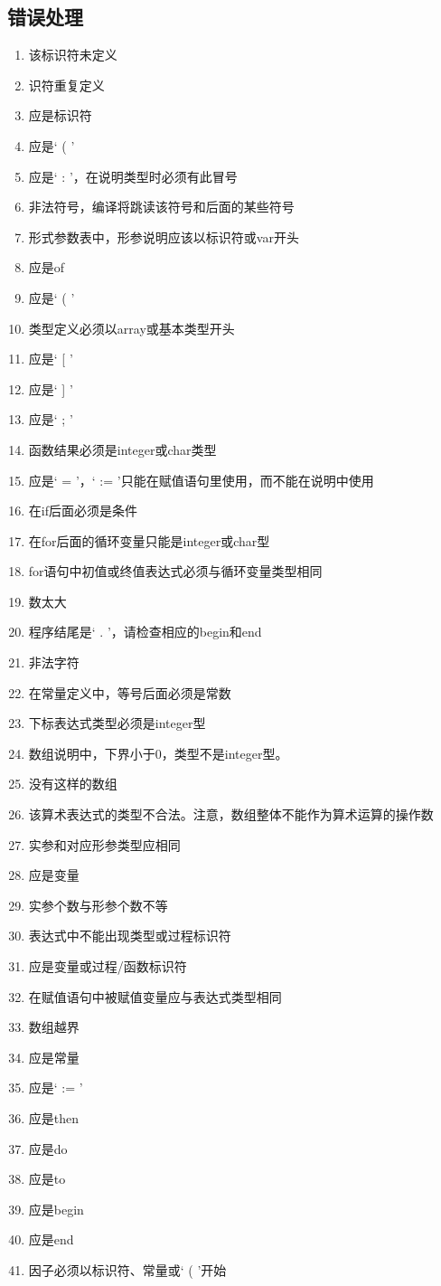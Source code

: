 \subsection{错误处理}
\begin{enumerate}
  \item 该标识符未定义
  \item 识符重复定义
  \item 应是标识符
  \item 应是‘ ( ’
  \item 应是‘ : ’，在说明类型时必须有此冒号
  \item 非法符号，编译将跳读该符号和后面的某些符号
  \item 形式参数表中，形参说明应该以标识符或var开头
  \item 应是of
  \item 应是‘ ( ’
  \item 类型定义必须以array或基本类型开头
  \item 应是‘ [ ’
  \item 应是‘ ] ’
  \item 应是‘ ; ’
  \item 函数结果必须是integer或char类型
  \item 应是‘ = ’，‘ := ’只能在赋值语句里使用，而不能在说明中使用
  \item 在if后面必须是条件
  \item 在for后面的循环变量只能是integer或char型
  \item for语句中初值或终值表达式必须与循环变量类型相同
  \item 数太大
  \item 程序结尾是‘ . ’，请检查相应的begin和end
  \item 非法字符
  \item 在常量定义中，等号后面必须是常数
  \item 下标表达式类型必须是integer型
  \item 数组说明中，下界小于0，类型不是integer型。
  \item 没有这样的数组
  \item 该算术表达式的类型不合法。注意，数组整体不能作为算术运算的操作数
  \item 实参和对应形参类型应相同
  \item 应是变量
  \item 实参个数与形参个数不等
  \item 表达式中不能出现类型或过程标识符
  \item 应是变量或过程/函数标识符
  \item 在赋值语句中被赋值变量应与表达式类型相同
  \item 数组越界
  \item 应是常量
  \item 应是‘ := ’
  \item 应是then
  \item 应是do
  \item 应是to
  \item 应是begin
  \item 应是end
  \item 因子必须以标识符、常量或‘ ( ’开始
\end{enumerate}
